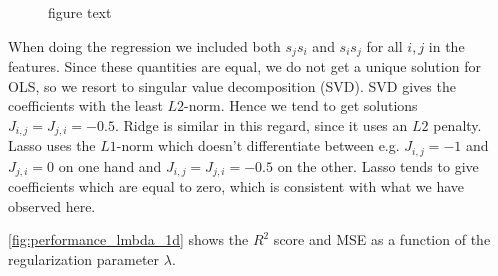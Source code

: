 \begin{figure}[H]
\qquad
{}
\qquad
{}
\caption{figure text}
\label{fig:j_lmbda}
\end{figure}

When doing the regression we included both $s_j s_i$ and $s_i s_j$ for all $i,j$ in the features. Since these quantities are equal, we do not get a unique solution for OLS, so we resort to singular value decomposition (SVD). SVD gives the coefficients with the least $L2$-norm. Hence we tend to get solutions $J_{i,j}=J_{j,i}=-0.5$. Ridge is similar in this regard, since it uses an $L2$ penalty. Lasso uses the $L1$-norm which doesn't differentiate between e.g. $J_{i,j}=-1$ and $J_{j,i} = 0$ on one hand and $J_{i,j}=J_{j,i}=-0.5$ on the other. Lasso tends to give coefficients which are equal to zero, which is consistent with what we have observed here.


\autoref{fig:performance_lmbda_1d} shows the $R^2$ score and MSE as a function of the regularization parameter $\lambda$.

